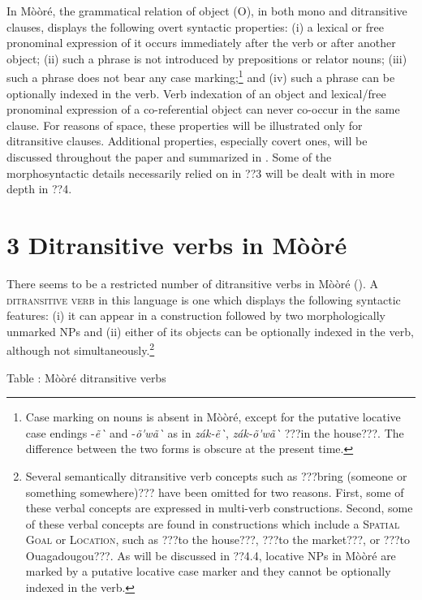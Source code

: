 \documentclass[output=paper]{langsci/langscibook}
\begin{document}
In M\`{o}\`{o}r\'{e}, the grammatical relation of object (O), in both mono and ditransitive clauses, displays the following overt syntactic properties: (i) a lexical or free pronominal expression of it occurs immediately after the verb or after another object; (ii) such a phrase is not introduced by prepositions or relator nouns; (iii) such a phrase does not bear any case marking;\footnote{ Case marking on nouns is absent in M\`{o}\`{o}r\'{e}, except for the putative locative case endings -\textit{\~{e}\`{ } }and -\textit{\~{o}\'{ }w\~{a}\`{ }} as in \textit{z\'{a}k-\~{e}\`{ }}, \textit{z\'{a}k-\~{o}\'{ }w\~{a}\`{ }} ???in the house???. The difference between the two forms is obscure at the present time.  }{ }and (iv) such a phrase can be optionally indexed in the verb. Verb indexation of an object and lexical/free pronominal expression of a co-referential object can never co-occur in the same clause. For reasons of space, these properties will be illustrated only for ditransitive clauses. Additional properties, especially covert ones, will be discussed throughout the paper and summarized in . Some of the morphosyntactic details necessarily relied on in ??3 will be dealt with in more depth in ??4.

\chapter{3 Ditransitive verbs in M\`{o}\`{o}r\'{e}}

There seems to be a restricted number of ditransitive verbs in M\`{o}\`{o}r\'{e} (). A \textsc{ditransitive verb} in this language is one which displays the following syntactic features: (i) it can appear in a construction followed by two morphologically unmarked NPs and (ii) either of its objects can be optionally indexed in the verb, although not simultaneously.\footnote{ {Several semantically ditransitive verb concepts such as ???bring (someone or something somewhere)??? have been omitted for two reasons. First, some of these verbal concepts are expressed in multi-verb constructions. Second, some of these verbal concepts are found in constructions which include a }{\textsc{Spatial}}{ }{\textsc{Goal}}{ or }{\textsc{Location}}{, such as ???to the house???, ???to the market???, or ???to Ouagadougou???. As will be discussed in ??4.4, locative NPs in M\`{o}\`{o}r\'{e} are marked by a putative locative case marker and they cannot be optionally indexed in the verb.} }{ }

\begin{styleTabellenberschrift}
\label{bkm:Ref446635932}Table : M\`{o}\`{o}r\'{e} ditransitive verbs
\end{styleTabellenberschrift}
\end{document}
